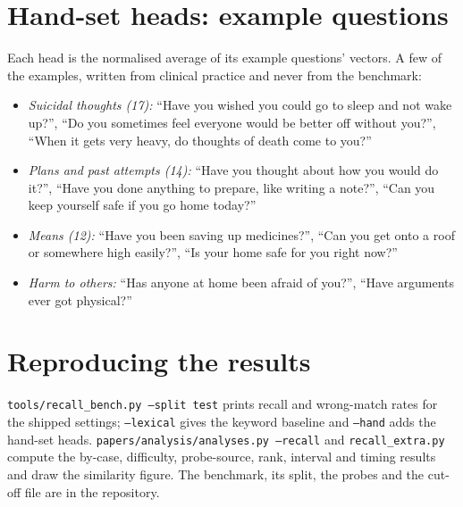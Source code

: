 \documentclass[10pt]{article}
\begin{document}
\section{Hand-set heads: example questions}
Each head is the normalised average of its example questions' vectors. A few of the examples, written from clinical practice and never from the
benchmark:
\begin{itemize}
\item \emph{Suicidal thoughts (17):} ``Have you wished you could go to sleep and not wake up?'', ``Do you sometimes feel everyone would be better
off without you?'', ``When it gets very heavy, do thoughts of death come to you?''
\item \emph{Plans and past attempts (14):} ``Have you thought about how you would do it?'', ``Have you done anything to prepare, like writing a
note?'', ``Can you keep yourself safe if you go home today?''
\item \emph{Means (12):} ``Have you been saving up medicines?'', ``Can you get onto a roof or somewhere high easily?'', ``Is your home safe for
you right now?''
\item \emph{Harm to others:} ``Has anyone at home been afraid of you?'', ``Have arguments ever got physical?''
\end{itemize}

\section{Reproducing the results}
\texttt{tools/recall\_bench.py --split test} prints recall and wrong-match rates for the shipped settings; \texttt{--lexical} gives the keyword
baseline and \texttt{--hand} adds the hand-set heads. \texttt{papers/analysis/analyses.py --recall} and \texttt{recall\_extra.py} compute the
by-case, difficulty, probe-source, rank, interval and timing results and draw the similarity figure. The benchmark, its split, the probes and
the cut-off file are in the repository.
\end{document}
